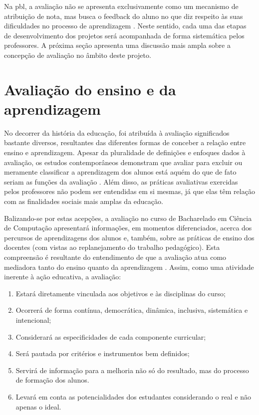 \documentclass[
	12pt,				%
	openright,			%
  oneside,     %
	a4paper,			%
 hyphens,
	chapter=TITLE,		%
	english,			%
	french,				%
	spanish,			%
	brazil				%
	]{abntex2}
\begin{document}
Na \acrshort{pbl}, a avaliação não se apresenta exclusivamente como um mecanismo de atribuição de nota, mas busca o feedback do aluno no que diz respeito às suas dificuldades no processo de aprendizagem \cite{carvalho2009ensino}. Neste sentido, cada uma das etapas de desenvolvimento dos projetos será acompanhada de forma sistemática pelos professores.	
A próxima seção apresenta uma discussão mais ampla sobre a concepção de avaliação no âmbito deste projeto.

\section{Avaliação do ensino e da aprendizagem}

No decorrer da história da educação, foi atribuída à avaliação significados bastante diversos, resultantes das diferentes formas de conceber a relação entre ensino e aprendizagem. Apesar da pluralidade de definições e enfoques dados à avaliação, os estudos contemporâneos demonstram que avaliar para excluir ou meramente classificar a aprendizagem dos alunos está aquém do que de fato seriam as funções da avaliação \cite{luckesi2005avaliaccao}. Além disso, as práticas avaliativas exercidas pelos professores não podem ser entendidas em si mesmas, já que elas têm relação com as finalidades sociais mais amplas da educação.
	
Balizando-se por estas acepções, a avaliação no curso de Bacharelado em Ciência de Computação apresentará informações, em momentos diferenciados, acerca dos percursos de aprendizagens dos alunos e, também, sobre as práticas de ensino dos docentes (com vistas ao replanejamento do trabalho pedagógico). Esta compreensão é resultante do entendimento de que a avaliação atua como mediadora tanto do ensino quanto da aprendizagem \cite{hoffmann2006avaliaccao}. Assim, como uma atividade inerente à ação educativa, a avaliação:

\begin{enumerate}[label=(\alph*)]
    \item Estará	diretamente vinculada aos objetivos e às disciplinas do curso; 
    \item Ocorrerá de forma contínua, democrática, dinâmica, inclusiva, sistemática e intencional;
    \item Considerará as especificidades de cada componente curricular;
    \item Será pautada por critérios e instrumentos bem definidos;
    \item Servirá de informação para a melhoria não só do resultado, mas do processo de formação dos alunos.
    \item Levará	em conta as potencialidades dos estudantes considerando o real e não apenas o ideal.
\end{enumerate}
\end{document}
